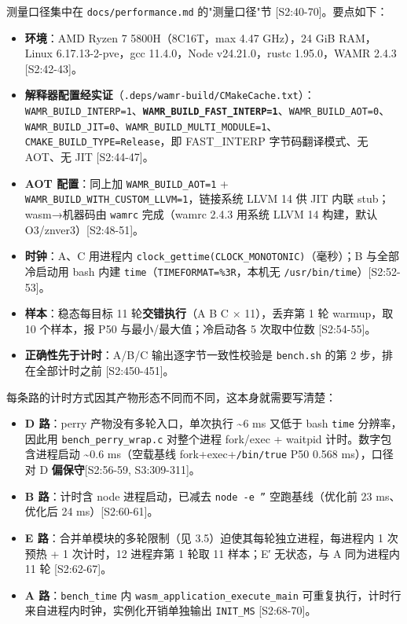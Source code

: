 \documentclass[11pt, a4paper]{article}
\begin{document}
测量口径集中在 \texttt{docs/performance.md} 的"测量口径"节 [S2:40-70]。要点如下：


\begin{itemize}
\item \textbf{环境}：AMD Ryzen 7 5800H（8C16T，max 4.47 GHz），24 GiB RAM，Linux 6.17.13-2-pve，gcc 11.4.0，Node v24.21.0，rustc 1.95.0，WAMR 2.4.3 [S2:42-43]。
\item \textbf{解释器配置经实证}（\texttt{.deps/wamr-build/CMakeCache.txt}）：\texttt{WAMR\_BUILD\_INTERP=1}、\textbf{\texttt{WAMR\_BUILD\_FAST\_INTERP=1}}、\texttt{WAMR\_BUILD\_AOT=0}、\texttt{WAMR\_BUILD\_JIT=0}、\texttt{WAMR\_BUILD\_MULTI\_MODULE=1}、\texttt{CMAKE\_BUILD\_TYPE=Release}，即 FAST\_INTERP 字节码翻译模式、无 AOT、无 JIT [S2:44-47]。
\item \textbf{AOT 配置}：同上加 \texttt{WAMR\_BUILD\_AOT=1} + \texttt{WAMR\_BUILD\_WITH\_CUSTOM\_LLVM=1}，链接系统 LLVM 14 供 JIT 内联 stub；wasm→机器码由 \texttt{wamrc} 完成（wamrc 2.4.3 用系统 LLVM 14 构建，默认 O3/znver3）[S2:48-51]。
\item \textbf{时钟}：A、C 用进程内 \texttt{clock\_gettime(CLOCK\_MONOTONIC)}（毫秒）；B 与全部冷启动用 bash 内建 \texttt{time}（\texttt{TIMEFORMAT=\%3R}，本机无 \texttt{/usr/bin/time}）[S2:52-53]。
\item \textbf{样本}：稳态每目标 11 轮\textbf{交错执行}（A B C × 11），丢弃第 1 轮 warmup，取 10 个样本，报 P50 与最小/最大值；冷启动各 5 次取中位数 [S2:54-55]。
\item \textbf{正确性先于计时}：A/B/C 输出逐字节一致性校验是 \texttt{bench.sh} 的第 2 步，排在全部计时之前 [S2:450-451]。
\end{itemize}

每条路的计时方式因其产物形态不同而不同，这本身就需要写清楚：


\begin{itemize}
\item \textbf{D 路}：perry 产物没有多轮入口，单次执行 \textasciitilde{}6 ms 又低于 bash \texttt{time} 分辨率，因此用 \texttt{bench\_perry\_wrap.c} 对整个进程 fork/exec + waitpid 计时。数字包含进程启动 \textasciitilde{}0.6 ms（空载基线 fork+exec+\texttt{/bin/true} P50 0.568 ms），口径对 D \textbf{偏保守}[S2:56-59, S3:309-311]。
\item \textbf{B 路}：计时含 node 进程启动，已减去 \texttt{node -e ''} 空跑基线（优化前 23 ms、优化后 24 ms）[S2:60-61]。
\item \textbf{E 路}：合并单模块的多轮限制（见 3.5）迫使其每轮独立进程，每进程内 1 次预热 + 1 次计时，12 进程弃第 1 轮取 11 样本；E′ 无状态，与 A 同为进程内 11 轮 [S2:62-67]。
\item \textbf{A 路}：\texttt{bench\_time} 内 \texttt{wasm\_application\_execute\_main} 可重复执行，计时行来自进程内时钟，实例化开销单独输出 \texttt{INIT\_MS} [S2:68-70]。
\end{itemize}
\end{document}
